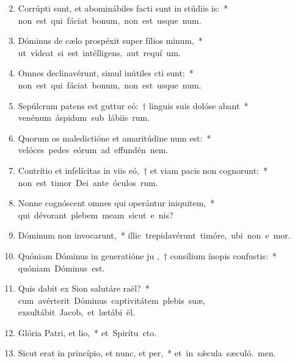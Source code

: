 \begin{flushleft}
\begin{enumerate}[leftmargin=*]
\setcounter{enumi}{1}


\item Corrúpti sunt, et abominábiles facti sunt in stúdiis is:~* \mbox{non est qui fáciat bonum, non est usque  num.}
\item Dóminus de cælo prospéxit super fílios minum,~* \mbox{ut vídeat si est intélligens, aut requí um.}
\item Omnes declinavérunt, simul inútiles cti sunt:~* \mbox{non est qui fáciat bonum, non est usque  num.}
\item Sepúlcrum patens est guttur eó:~† linguis suis dolóse abant~* \mbox{venénum áspidum sub lábiis rum.}
\item Quorum os maledictióne et amaritúdine num est:~* \mbox{velóces pedes eórum ad effundén nem.}
\item Contrítio et infelícitas in viis eó,~† et viam pacis non cognorunt:~* \mbox{non est timor Dei ante óculos rum.}
\item Nonne cognóscent omnes qui operántur iniquitem,~* \mbox{qui dévorant plebem meam sicut e nis?}
\item Dóminum non invocarunt,~* \mbox{illic trepidavérunt timóre, ubi non e mor.}
\item Quóniam Dóminus in generatióne ju ,~† consílium ínopis confustis:~* \mbox{quóniam Dóminus   est.}
\item \sloppy Quis dabit ex Sion salutáre raël?~* \mbox{cum avérterit Dóminus captivitátem plebis suæ,} \mbox{exsultábit Jacob, et lætábi ël.}
\item Glória Patri, et lio,~* \mbox{et Spirítu cto.}
\item Sicut erat in princípio, et nunc, et per,~* \mbox{et in s\'{\ae}cula sæculó. men.}


\end{enumerate}
\end{flushleft}

